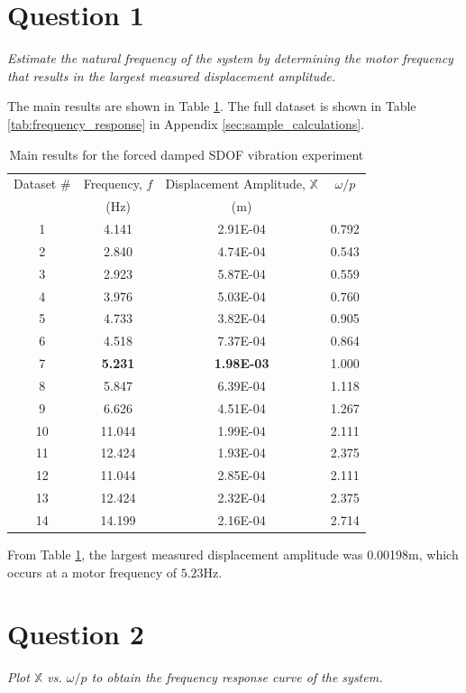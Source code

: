 \section{Question 1}
\textit{Estimate the natural frequency of the system by determining the motor frequency that results in the largest measured displacement amplitude.}

The main results are shown in Table \ref{tab:main_results}. The full dataset is shown in Table \ref{tab:frequency_response} in Appendix \ref{sec:sample_calculations}.
\begin{table}[H]
    \centering
    \caption{Main results for the forced damped SDOF vibration experiment}
    \label{tab:main_results}
    \begin{tabular}{cccc}
        \toprule
        Dataset \# & Frequency, $f$ & Displacement Amplitude, $\mathbb{X}$ & $\omega/p$ \\
        & (Hz) & (m) & \\
        \midrule
        1 & 4.141 & 2.91E-04 & 0.792 \\
        2 & 2.840 & 4.74E-04 & 0.543 \\
        3 & 2.923 & 5.87E-04 & 0.559 \\
        4 & 3.976 & 5.03E-04 & 0.760 \\
        5 & 4.733 & 3.82E-04 & 0.905 \\
        6 & 4.518 & 7.37E-04 & 0.864 \\
        7 & \textbf{5.231} & \textbf{1.98E-03} & 1.000 \\
        8 & 5.847 & 6.39E-04 & 1.118 \\
        9 & 6.626 & 4.51E-04 & 1.267 \\
        10 & 11.044 & 1.99E-04 & 2.111 \\
        11 & 12.424 & 1.93E-04 & 2.375 \\
        12 & 11.044 & 2.85E-04 & 2.111 \\
        13 & 12.424 & 2.32E-04 & 2.375 \\
        14 & 14.199 & 2.16E-04 & 2.714 \\
        \bottomrule
    \end{tabular}
\end{table}
From Table \ref{tab:main_results}, the largest measured displacement amplitude was 0.00198m, which occurs at a motor frequency of $\boxed{5.23 \text{Hz}}$.

\section{Question 2}
\textit{Plot $\mathbb{X}$ vs. $\omega/p$ to obtain the frequency response curve of the system.}

